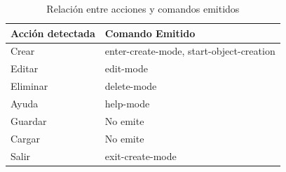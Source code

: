 \documentclass[a4paper, 12pt]{book}
\begin{document}
\begin{itemize}
\begin{table}[H]
\centering
\begin{tabular}{|l|l|}
\hline
\textbf{Acción detectada} & \textbf{Comando Emitido} \\
\hline
Crear          & enter-create-mode, start-object-creation \\
Editar         & edit-mode \\
Eliminar       & delete-mode \\
Ayuda          & help-mode \\
Guardar        & No emite \\
Cargar         & No emite \\
Salir          & exit-create-mode \\
\hline
\end{tabular}
\caption{Relación entre acciones y comandos emitidos}
\label{tabla:comandos}
\end{table}


\end{itemize}
\end{document}
